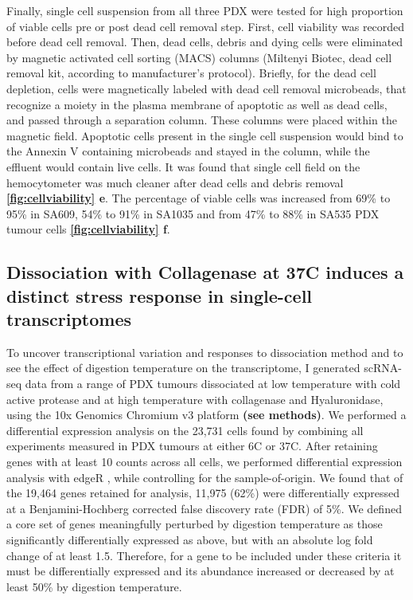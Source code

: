 Finally, single cell suspension from all three PDX were tested for high proportion of viable cells pre or post dead cell removal step. First, cell viability was recorded before dead cell removal. Then, dead cells, debris and dying cells were eliminated by magnetic activated cell sorting (MACS) columns (Miltenyi Biotec, dead cell removal kit, according to manufacturer's protocol). Briefly, for the dead cell
depletion, cells were magnetically labeled with dead cell removal
microbeads, that recognize a moiety in the plasma
membrane of apoptotic as well as dead cells, and passed through a separation column. These columns were placed within the magnetic field. Apoptotic cells present in the single cell suspension would bind to the Annexin V containing microbeads and stayed in the column, while the effluent would contain live cells. It was found that single cell field on the hemocytometer was much cleaner after dead cells and debris removal \textbf{\autoref{fig:cellviability} e}.
The percentage of viable cells was increased from 69\% to 95\% in SA609, 54\% to 91\% in SA1035 and from 47\% to 88\% in SA535 PDX tumour cells \textbf{\autoref{fig:cellviability} f}. 







\subsection{Dissociation with Collagenase at 37\textdegree C induces a distinct stress response in single-cell transcriptomes}
To uncover transcriptional variation and responses to dissociation method and to see the effect of digestion temperature on the transcriptome, I generated scRNA-seq data from a range of PDX tumours dissociated at low temperature with cold active protease and at high temperature with collagenase and Hyaluronidase, using the 10x Genomics Chromium v3 platform \textbf{(see methods)}.
We performed a differential expression analysis on the 23,731 cells found by combining all experiments measured in PDX tumours at either 6\textdegree C or 37\textdegree C. After retaining genes with at least 10 counts across all cells, we performed differential expression analysis with edgeR \cite{robinson2010edger}, while controlling for the sample-of-origin.
We found that of the 19,464 genes retained for analysis, 11,975 (62\%) were differentially expressed at a Benjamini-Hochberg corrected false discovery rate (FDR) of 5\%. We defined a core set of genes meaningfully perturbed by digestion temperature as those significantly differentially expressed as above, but with an absolute log fold change of at least 1.5. Therefore, for a gene to be included under these criteria it must be differentially expressed and its abundance increased or decreased by at least 50\% by digestion temperature. 

